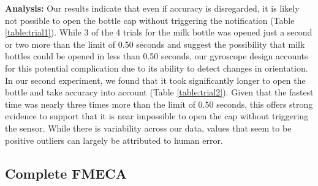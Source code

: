 \documentclass[12pt]{article}
\begin{document}
		\textbf{Analysis:} Our results indicate that even if accuracy is disregarded, it is likely not possible to open the bottle cap without triggering the notification (Table \ref{table:trial1}). While 3 of the 4 trials for the milk bottle was opened just a second or two more than the limit of 0.50 seconds and suggest the possibility that milk bottles could be opened in less than 0.50 seconds, our gyroscope design accounts for this potential complication due to its ability to detect changes in orientation. In our second experiment, we found that it took significantly longer to open the bottle and take accuracy into account (Table \ref{table:trial2}). Given that the fastest time was nearly three times more than the limit of 0.50 seconds, this offers strong evidence to support that it is near impossible to open the cap without triggering the sensor. While there is variability across our data, values that seem to be positive outliers can largely be attributed to human error.
		
		\subsection*{Complete FMECA}
\end{document}

